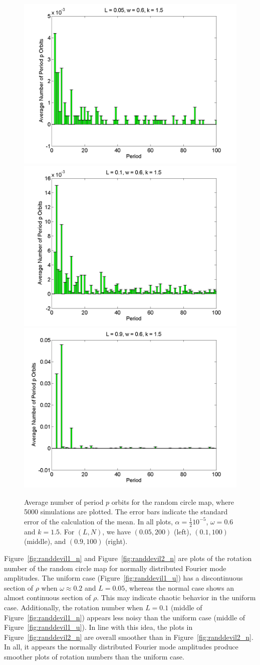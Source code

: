 \begin{figure}[H]\linespread{1}
\caption[Average number of period $p$ orbits for the random circle
map (normal distribution), for $\alpha=\frac{1}{2}10^{-5}$, $\omega=0.6$ and $k=1.5$]{Average number of period $p$ orbits for the random circle
map, where 5000 simulations are plotted. The error bars indicate
the standard error of the calculation of the mean. In all plots,
$\alpha = \frac{1}{2}10^{-5}$, $\omega=0.6$ and $k=1.5$. For $(L,N)$,
we have $(0.05, 200)$ (left), $(0.1, 100)$
(middle), and $(0.9, 100)$ (right).}\label{fig:rcirchist_n2_ha}
	\begin{center}	\includegraphics[width=.33\textwidth]{figs/rcirc_hist_n_halfa_L_005_w_06_k_15_sims_5000.png}\hfill
\includegraphics[width=.33\textwidth]{figs/rcirc_hist_n_halfa_L_01_w_06_k_15_sims_5000.png}\hfill
\includegraphics[width=.33\textwidth]{figs/rcirc_hist_n_halfa_L_09_w_06_k_15_sims_5000.png}
	\end{center}
\end{figure}

Figure~\ref{fig:randdevil1_n} and Figure~\ref{fig:randdevil2_n} are
plots of the rotation number of the random circle map for normally
distributed Fourier mode amplitudes. The uniform case
(Figure~\ref{fig:randdevil1_u}) has a discontinuous section of $\rho$
when $\omega \approx 0.2$ and $L=0.05$, whereas the normal case shows
an almost continuous section of $\rho$. This may indicate chaotic
behavior in the uniform case. Additionally, the rotation number when
$L=0.1$ (middle of Figure~\ref{fig:randdevil1_n}) appears less noisy
than the uniform case (middle of
Figure~\ref{fig:randdevil1_u}). In line with this idea, the plots in
Figure~\ref{fig:randdevil2_n} are overall smoother than in
Figure~\ref{fig:randdevil2_n}. In all, it appears the normally
distributed Fourier mode amplitudes produce smoother plots of rotation
numbers than the uniform case.

